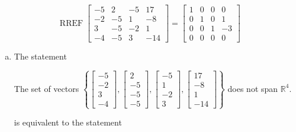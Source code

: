\begin{exerciseAnswer} 


\[\operatorname{RREF} \left[\begin{array}{cccc}
-5 & 2 & -5 & 17 \\
-2 & -5 & 1 & -8 \\
3 & -5 & -2 & 1 \\
-4 & -5 & 3 & -14
\end{array}\right] = \left[\begin{array}{cccc}
1 & 0 & 0 & 0 \\
0 & 1 & 0 & 1 \\
0 & 0 & 1 & -3 \\
0 & 0 & 0 & 0
\end{array}\right] \]


\begin{enumerate}[(a)]
\item The statement 
\begin{center}\begin{minipage}{0.8\textwidth}
 The set of vectors \( \left\{ \left[\begin{array}{c}
-5 \\
-2 \\
3 \\
-4
\end{array}\right] , \left[\begin{array}{c}
2 \\
-5 \\
-5 \\
-5
\end{array}\right] , \left[\begin{array}{c}
-5 \\
1 \\
-2 \\
3
\end{array}\right] , \left[\begin{array}{c}
17 \\
-8 \\
1 \\
-14
\end{array}\right] \right\} \) does not span \(\mathbb{R}^4\). 
\end{minipage}\end{center}
     is equivalent to the statement 
\begin{center}\begin{minipage}{0.8\textwidth}
 The vector equation \( x_{1} \left[\begin{array}{c}
-5 \\
-2 \\

\end{array}
\end{minipage}
\end{center}
\end{enumerate}
\end{exerciseAnswer}

